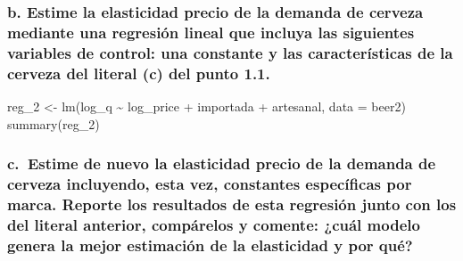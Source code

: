 \documentclass[
]{article}
\newenvironment{Shaded}{\begin{snugshade}}{\end{snugshade}}
\newcommand{\AttributeTok}[1]{\textcolor[rgb]{0.77,0.63,0.00}{#1}}
\newcommand{\FunctionTok}[1]{\textcolor[rgb]{0.00,0.00,0.00}{#1}}
\newcommand{\NormalTok}[1]{#1}
\newcommand{\OtherTok}[1]{\textcolor[rgb]{0.56,0.35,0.01}{#1}}
\newcommand{\SpecialCharTok}[1]{\textcolor[rgb]{0.00,0.00,0.00}{#1}}
\begin{document}
\hypertarget{b.-estime-la-elasticidad-precio-de-la-demanda-de-cerveza-mediante-una-regresiuxf3n-lineal-que-incluya-las-siguientes-variables-de-control-una-constante-y-las-caracteruxedsticas-de-la-cerveza-del-literal-c-del-punto-1.1.}{%
\subsubsection{b. Estime la elasticidad precio de la demanda de cerveza
mediante una regresión lineal que incluya las siguientes variables de
control: una constante y las características de la cerveza del literal
(c) del punto
1.1.}\label{b.-estime-la-elasticidad-precio-de-la-demanda-de-cerveza-mediante-una-regresiuxf3n-lineal-que-incluya-las-siguientes-variables-de-control-una-constante-y-las-caracteruxedsticas-de-la-cerveza-del-literal-c-del-punto-1.1.}}

\begin{Shaded}
\begin{Highlighting}[]
\NormalTok{reg\_2 }\OtherTok{\textless{}{-}} \FunctionTok{lm}\NormalTok{(log\_q }\SpecialCharTok{\textasciitilde{}}\NormalTok{ log\_price }\SpecialCharTok{+}\NormalTok{ importada }\SpecialCharTok{+}\NormalTok{ artesanal, }\AttributeTok{data =}\NormalTok{ beer2)}
\FunctionTok{summary}\NormalTok{(reg\_2)}
\end{Highlighting}
\end{Shaded}

\hypertarget{c.-estime-de-nuevo-la-elasticidad-precio-de-la-demanda-de-cerveza-incluyendo-esta-vez-constantes-especuxedficas-por-marca.-reporte-los-resultados-de-esta-regresiuxf3n-junto-con-los-del-literal-anterior-compuxe1relos-y-comente-cuuxe1l-modelo-genera-la-mejor-estimaciuxf3n-de-la-elasticidad-y-por-quuxe9}{%
\subsubsection{c.~Estime de nuevo la elasticidad precio de la demanda de
cerveza incluyendo, esta vez, constantes específicas por marca. Reporte
los resultados de esta regresión junto con los del literal anterior,
compárelos y comente: ¿cuál modelo genera la mejor estimación de la
elasticidad y por
qué?}\label{c.-estime-de-nuevo-la-elasticidad-precio-de-la-demanda-de-cerveza-incluyendo-esta-vez-constantes-especuxedficas-por-marca.-reporte-los-resultados-de-esta-regresiuxf3n-junto-con-los-del-literal-anterior-compuxe1relos-y-comente-cuuxe1l-modelo-genera-la-mejor-estimaciuxf3n-de-la-elasticidad-y-por-quuxe9}}
\end{document}
